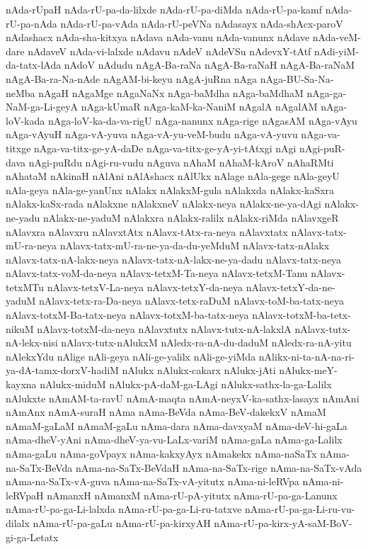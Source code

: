 {nAda-rUpaH
nAda-rU-pa-da-lilxde
nAda-rU-pa-diMda
nAda-rU-pa-kamf
nAda-rU-pa-nAda
nAda-rU-pa-vAda
nAda-rU-peVNa
nAdasayx
nAda-shAcx-paroV
nAdashacx
nAda-sha-kitxya
nAdava
nAda-vanu
nAda-vanunx
nAdave
nAda-veM-dare
nAdaveV
nAda-vi-lalxde
nAdavu
nAdeV
nAdeVSu
nAdevxY-tAtf
nAdi-yiM-da-tatx-lAda
nAdoV
nAdudu
nAgA-Ba-raNa
nAgA-Ba-raNaH
nAgA-Ba-raNaM
nAgA-Ba-ra-Na-nAde
nAgAM-bi-keyu
nAgA-juRna
nAga
nAga-BU-Sa-Na-neMba
nAgaH
nAgaMge
nAgaNaNx
nAga-baMdha
nAga-baMdhaM
nAga-ga-NaM-ga-Li-geyA
nAga-kUmaR
nAga-kaM-ka-NaniM
nAgalA
nAgalAM
nAga-loV-kada
nAga-loV-ka-da-va-rigU
nAga-nanunx
nAga-rige
nAgasAM
nAga-vAyu
nAga-vAyuH
nAga-vA-yuva
nAga-vA-yu-veM-budu
nAga-vA-yuvu
nAga-va-titxge
nAga-va-titx-ge-yA-daDe
nAga-va-titx-ge-yA-yi-tAtxgi
nAgi
nAgi-puR-dava
nAgi-puRdu
nAgi-ru-vudu
nAguva
nAhaM
nAhaM-kAroV
nAhaRMti
nAhataM
nAkinaH
nAlAni
nAlAshacx
nAlUkx
nAlage
nAla-gege
nAla-geyU
nAla-geya
nAla-ge-yanUnx
nAlakx
nAlakxM-gula
nAlakxda
nAlakx-kaSxra
nAlakx-kaSx-rada
nAlakxne
nAlakxneV
nAlakx-neya
nAlakx-ne-ya-dAgi
nAlakx-ne-yadu
nAlakx-ne-yaduM
nAlakxra
nAlakx-ralilx
nAlakx-riMda
nAlavxgeR
nAlavxra
nAlavxru
nAlavxtAtx
nAlavx-tAtx-ra-neya
nAlavxtatx
nAlavx-tatx-mU-ra-neya
nAlavx-tatx-mU-ra-ne-ya-da-du-yeMduM
nAlavx-tatx-nAlakx
nAlavx-tatx-nA-lakx-neya
nAlavx-tatx-nA-lakx-ne-ya-dadu
nAlavx-tatx-neya
nAlavx-tatx-voM-da-neya
nAlavx-tetxM-Ta-neya
nAlavx-tetxM-Tanu
nAlavx-tetxMTu
nAlavx-tetxV-La-neya
nAlavx-tetxY-da-neya
nAlavx-tetxY-da-ne-yaduM
nAlavx-tetx-ra-Da-neya
nAlavx-tetx-raDuM
nAlavx-toM-ba-tatx-neya
nAlavx-totxM-Ba-tatx-neya
nAlavx-totxM-ba-tatx-neya
nAlavx-totxM-ba-tetx-nikuM
nAlavx-totxM-da-neya
nAlavxtutx
nAlavx-tutx-nA-lakxlA
nAlavx-tutx-nA-lekx-nisi
nAlavx-tutx-nAlukxM
nAledx-ra-nA-du-daduM
nAledx-ra-nA-yitu
nAlekxYdu
nAlige
nAli-geya
nAli-ge-yalilx
nAli-ge-yiMda
nAlikx-ni-ta-nA-na-ri-ya-dA-tamx-dorxV-hadiM
nAlukx
nAlukx-cakarx
nAlukx-jAti
nAlukx-meY-kayxna
nAlukx-miduM
nAlukx-pA-daM-ga-LAgi
nAlukx-sathx-la-ga-Lalilx
nAlukxte
nAmAM-ta-ravU
nAmA-maqta
nAmA-neyxV-ka-sathx-lasayx
nAmAni
nAmAnx
nAmA-suraH
nAma
nAma-BeVda
nAma-BeV-dakekxV
nAmaM
nAmaM-gaLaM
nAmaM-gaLu
nAma-dara
nAma-davxyaM
nAma-deV-hi-gaLa
nAma-dheV-yAni
nAma-dheV-ya-vu-LaLx-variM
nAma-gaLa
nAma-ga-Lalilx
nAma-gaLu
nAma-goVpayx
nAma-kakxyAyx
nAmakekx
nAma-naSaTx
nAma-na-SaTx-BeVda
nAma-na-SaTx-BeVdaH
nAma-na-SaTx-rige
nAma-na-SaTx-vAda
nAma-na-SaTx-vA-guva
nAma-na-SaTx-vA-yitutx
nAma-ni-leRVpa
nAma-ni-leRVpaH
nAmanxH
nAmanxM
nAma-rU-pA-yitutx
nAma-rU-pa-ga-Lanunx
nAma-rU-pa-ga-Li-lalxda
nAma-rU-pa-ga-Li-ru-tatxve
nAma-rU-pa-ga-Li-ru-vu-dilalx
nAma-rU-pa-gaLu
nAma-rU-pa-kirxyAH
nAma-rU-pa-kirx-yA-saM-BoV-gi-ga-Letatx
}
